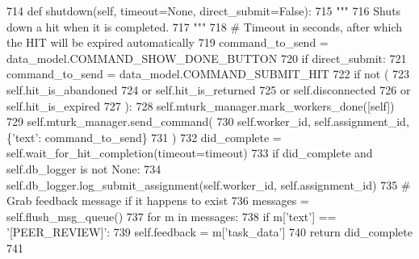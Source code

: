 \begin{DoxyCode}
714     \textcolor{keyword}{def }shutdown(self, timeout=None, direct\_submit=False):
715         \textcolor{stringliteral}{"""}
716 \textcolor{stringliteral}{        Shuts down a hit when it is completed.}
717 \textcolor{stringliteral}{        """}
718         \textcolor{comment}{# Timeout in seconds, after which the HIT will be expired automatically}
719         command\_to\_send = data\_model.COMMAND\_SHOW\_DONE\_BUTTON
720         \textcolor{keywordflow}{if} direct\_submit:
721             command\_to\_send = data\_model.COMMAND\_SUBMIT\_HIT
722         \textcolor{keywordflow}{if} \textcolor{keywordflow}{not} (
723             self.hit\_is\_abandoned
724             \textcolor{keywordflow}{or} self.hit\_is\_returned
725             \textcolor{keywordflow}{or} self.disconnected
726             \textcolor{keywordflow}{or} self.hit\_is\_expired
727         ):
728             self.mturk\_manager.mark\_workers\_done([self])
729             self.mturk\_manager.send\_command(
730                 self.worker\_id, self.assignment\_id, \{\textcolor{stringliteral}{'text'}: command\_to\_send\}
731             )
732             did\_complete = self.wait\_for\_hit\_completion(timeout=timeout)
733             \textcolor{keywordflow}{if} did\_complete \textcolor{keywordflow}{and} self.db\_logger \textcolor{keywordflow}{is} \textcolor{keywordflow}{not} \textcolor{keywordtype}{None}:
734                 self.db\_logger.log\_submit\_assignment(self.worker\_id, self.assignment\_id)
735             \textcolor{comment}{# Grab feedback message if it happens to exist}
736             messages = self.flush\_msg\_queue()
737             \textcolor{keywordflow}{for} m \textcolor{keywordflow}{in} messages:
738                 \textcolor{keywordflow}{if} m[\textcolor{stringliteral}{'text'}] == \textcolor{stringliteral}{'[PEER\_REVIEW]'}:
739                     self.feedback = m[\textcolor{stringliteral}{'task\_data'}]
740             \textcolor{keywordflow}{return} did\_complete
741 
\end{DoxyCode}
\mbox{\label{classparlai_1_1mturk_1_1core_1_1legacy__2018_1_1agents_1_1MTurkAgent_a8f1e6f940081eab5ce329b106c61b294}} 
